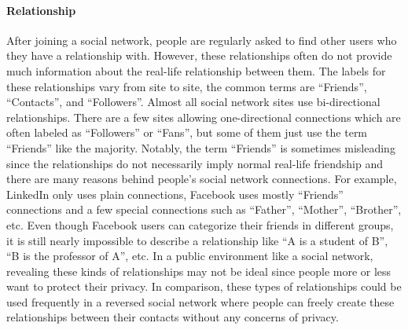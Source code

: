 \paragraph{Relationship}
After joining a social network, people are regularly asked to find other users who they have a relationship with. However, these relationships often do not provide much information about the real-life relationship between them. The labels for these relationships vary from site to site, the common terms are ``Friends'', ``Contacts'', and ``Followers''. Almost all social network sites use bi-directional relationships. There are a few sites allowing one-directional connections which are often labeled as ``Followers'' or ``Fans'', but some of them just use the term ``Friends'' like the majority. Notably, the term ``Friends'' is sometimes misleading since the relationships do not necessarily imply normal real-life friendship and there are many reasons behind people's social network connections. For example, LinkedIn only uses plain connections, Facebook uses mostly ``Friends'' connections and a few special connections such as ``Father'', ``Mother'', ``Brother'', etc. Even though Facebook users can categorize their friends in different groups, it is still nearly impossible to describe a relationship like ``A is a student of B'', ``B is the professor of A'', etc. In a public environment like a social network, revealing these kinds of relationships may not be ideal since people more or less want to protect their privacy. In comparison, these types of relationships could be used frequently in a reversed social network where people can freely create these relationships between their contacts without any concerns of privacy.

